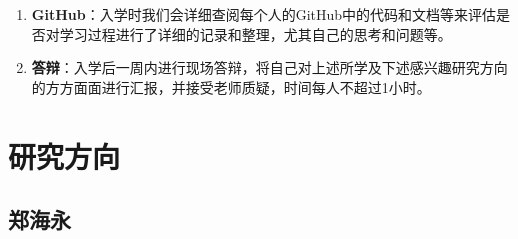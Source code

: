 \documentclass[14pt,a4paper]{extarticle}
\begin{document}
\begin{enumerate}
\item \textbf{GitHub}：入学时我们会详细查阅每个人的GitHub中的代码和文档等来评估是否对学习过程进行了详细的记录和整理，尤其自己的思考和问题等。
\item \textbf{答辩}：入学后一周内进行现场答辩，将自己对上述所学及下述感兴趣研究方向的方方面面进行汇报，并接受老师质疑，时间每人不超过1小时。
\end{enumerate}

\section{研究方向}

\subsection{郑海永}
\end{document}
